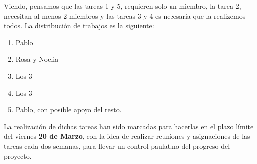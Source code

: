 \documentclass[a4paper,10pt]{article}
\begin{document}
\noindent Viendo, pensamos que las tareas 1 y 5, requieren solo un
miembro, la tarea 2, necesitan al menos 2 miembros y las tareas 3 y 4
es necesaria que la realizemos todos. La distribución de trabajos es
la siguiente:

\begin{enumerate}
\item Pablo
\item Rosa y Noelia
\item Los 3
\item Los 3
\item Pablo, con posible apoyo del resto.
\end{enumerate}

\noindent La realización de dichas tareas han sido marcadas para
hacerlas en el plazo límite del viernes \textbf{20 de Marzo}, con la
idea de realizar reuniones y asignaciones de las tareas cada dos
semanas, para llevar un control paulatino del progreso del proyecto.
\end{document}
